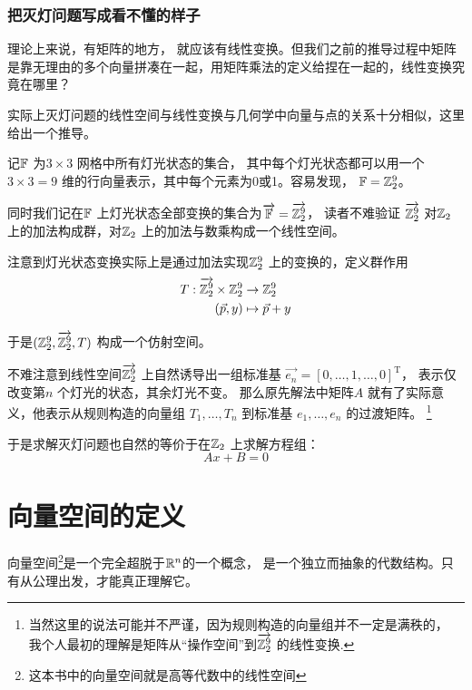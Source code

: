 \subsubsection{把灭灯问题写成看不懂的样子}

理论上来说，有矩阵的地方，
就应该有线性变换。但我们之前的推导过程中矩阵是靠无理由的多个向量拼凑在一起，用矩阵乘法的定义给捏在一起的，线性变换究竟在哪里？

实际上灭灯问题的线性空间与线性变换与几何学中向量与点的关系十分相似，这里给出一个推导。

记\(\mathbb{F}\) 为\(3 \times 3\) 网格中所有灯光状态的集合，
其中每个灯光状态都可以用一个\(3 \times 3=9\) 维的行向量表示，其中每个元素为0或1。容易发现，
\(\mathbb{F}=\mathbb{Z}_{2}^{9}\)。

同时我们记在\(\mathbb{F}\)
上灯光状态全部变换的集合为\(\overrightarrow{\mathbb{F}}=\overrightarrow{\mathbb{Z}_{2}^{9}}\)，
读者不难验证 \(\overrightarrow{\mathbb{Z}_{2}^{9}}\)
对\(\mathbb{Z}_{2}\)上的加法构成群，对\(\mathbb{Z}_{2}\) 上的加法与数乘构成一个线性空间。

注意到灯光状态变换实际上是通过加法实现\(\mathbb{Z}^{9}_{2}\) 上的变换的，定义群作用
\begin{align*}
    T: \overrightarrow{\mathbb{Z}_{2}^{9}} \times
    \mathbb{Z}_{2}^{9} &\to \mathbb{Z}_{2}^{9}\\
    (\vec{p},y) &\mapsto \vec{p}+y
\end{align*}

于是\((\mathbb{Z}^{9}_{2}, \overrightarrow{\mathbb{Z}^{9}_{2}}, T)\) 构成一个仿射空间。

不难注意到线性空间\(\overrightarrow{\mathbb{Z}^{9}_{2}}\) 上自然诱导出一组标准基
\(\overrightarrow{e_{n}}=[0,\dots,1,\dots,0]^{\mathrm{T}}\)，
表示仅改变第\(n\) 个灯光的状态，其余灯光不变。 那么原先解法中矩阵\(A\) 就有了实际意义，他表示从规则构造的向量组
\({T_{1}, \dots, T_{n}}\) 到标准基 \({e_{1}, \dots, e_{n}}\) 的过渡矩阵。
\footnote{当然这里的说法可能并不严谨，因为规则构造的向量组并不一定是满秩的，
我个人最初的理解是矩阵从``操作空间''到\(\overrightarrow{\mathbb{Z}^{9}_{2}}\) 的线性变换.}

于是求解灭灯问题也自然的等价于在\(\mathbb{Z}_{2}\) 上求解方程组：
\[
    Ax+B=0
\]

\section{向量空间的定义}
向量空间\footnote{这本书中的向量空间就是高等代数中的线性空间}是一个完全超脱于\(\mathbb{R}^{n}\)的一个概念，
是一个独立而抽象的代数结构。只有从公理出发，才能真正理解它。

